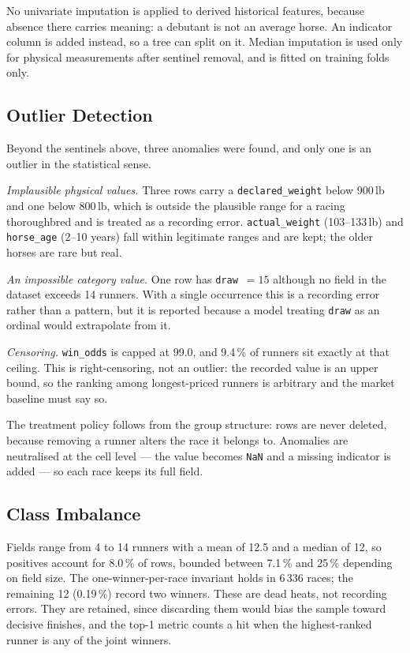 No univariate imputation is applied to derived historical features,
because absence there carries meaning: a debutant is not an average horse.
An indicator column is added instead, so a tree can split on it. Median
imputation is used only for physical measurements after sentinel removal,
and is fitted on training folds only.

\subsection{Outlier Detection}
\label{sec:outliers}

Beyond the sentinels above, three anomalies were found, and only one is an
outlier in the statistical sense.

\emph{Implausible physical values.} Three rows carry a
\texttt{declared\_weight} below 900\,lb and one below 800\,lb, which is
outside the plausible range for a racing thoroughbred and is treated as a
recording error. \texttt{actual\_weight} (103--133\,lb) and
\texttt{horse\_age} (2--10 years) fall within legitimate ranges and are
kept; the older horses are rare but real.

\emph{An impossible category value.} One row has \texttt{draw}~$=15$
although no field in the dataset exceeds 14 runners. With a single
occurrence this is a recording error rather than a pattern, but it is
reported because a model treating \texttt{draw} as an ordinal would
extrapolate from it.

\emph{Censoring.} \texttt{win\_odds} is capped at 99.0, and 9.4\,\% of
runners sit exactly at that ceiling. This is right-censoring, not an
outlier: the recorded value is an upper bound, so the ranking among
longest-priced runners is arbitrary and the market baseline must say so.

The treatment policy follows from the group structure: rows are never
deleted, because removing a runner alters the race it belongs to.
Anomalies are neutralised at the cell level --- the value becomes
\texttt{NaN} and a missing indicator is added --- so each race keeps its
full field.

\subsection{Class Imbalance}
\label{sec:imbalance}

Fields range from 4 to 14 runners with a mean of 12.5 and a median of 12,
so positives account for 8.0\,\% of rows, bounded between 7.1\,\% and
25\,\% depending on field size. The one-winner-per-race invariant holds in
6\,336 races; the remaining 12 (0.19\,\%) record two winners. These are
dead heats, not recording errors. They are retained, since discarding them
would bias the sample toward decisive finishes, and the top-1 metric counts
a hit when the highest-ranked runner is any of the joint winners.


